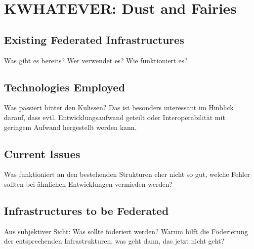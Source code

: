 \section{KWHATEVER: Dust and Fairies}


\subsection{Existing Federated Infrastructures}

Was gibt es bereits?  Wer verwendet es?  Wie funktioniert es?

\subsection{Technologies Employed}

Was passiert hinter den Kulissen?  Das ist besonders interessant im
Hinblick darauf, dass evtl. Entwicklungsaufwand geteilt oder
Interoperabilität mit geringem Aufwand hergestellt werden kann.

\subsection{Current Issues}

Was funktioniert an den bestehenden Strukturen eher nicht so gut, welche
Fehler sollten bei ähnlichen Entwicklungen vermieden werden?

\subsection{Infrastructures to be Federated}

Aus subjektiver Sicht: Was sollte föderiert werden?  Warum hilft die
Föderierung der entsprechenden Infrastrukturen, was geht dann, das
jetzt nicht geht?
